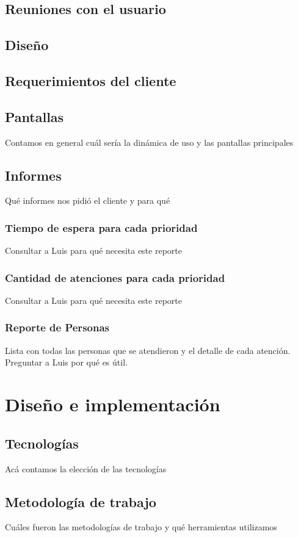 \documentclass[a4paper,10pt]{article}
\begin{document}
\subsection{Reuniones con el usuario}
\subsection{Diseño}

\subsection{Requerimientos del cliente}
\subsection{Pantallas}
Contamos en general cuál sería la dinámica de uso y las pantallas principales
\subsection{Informes}
Qué informes nos pidió el cliente y para qué

\subsubsection{Tiempo de espera para cada prioridad}
Consultar a Luis para qué necesita este reporte
\subsubsection{Cantidad de atenciones para cada prioridad}
Consultar a Luis para qué necesita este reporte
\subsubsection{Reporte de Personas}
Lista con todas las personas que se atendieron y el detalle de cada atención. Preguntar a Luis por qué es útil.


\newpage 
\section{Diseño e implementación}
\subsection{Tecnologías}
Acá contamos la elección de las tecnologías

\subsection{Metodología de trabajo}
Cuáles fueron las metodologías de trabajo y qué herramientas utilizamos
\end{document}
